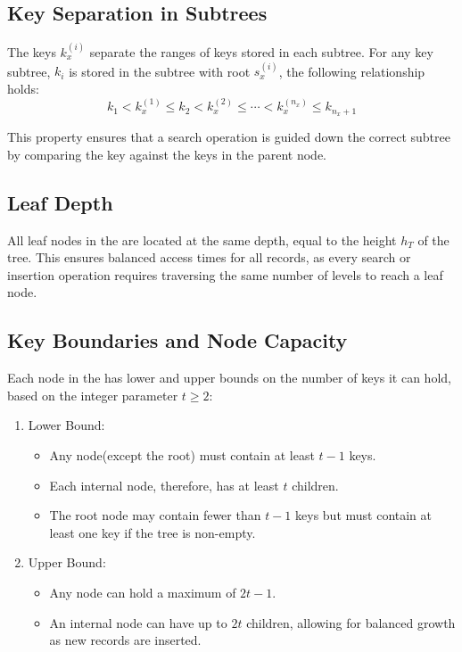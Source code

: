 \subsection{Key Separation in Subtrees}

The keys $k_x^{(i)}$ separate the ranges of keys stored in each subtree. For any key subtree, $k_i$ is stored in the subtree with root $s_x^{(i)}$, the following relationship holds:  $$k_1<k_x^{(1)}\le k_2<k_x^{(2)}\le \cdots <k_x^{(n_x)}\le k_{n_x+1}$$

This property ensures that a search operation is guided down the correct subtree by comparing the key against the keys in the parent node.

\subsection{Leaf Depth}
All leaf nodes in the \bplustree are located at the same depth, equal to the height $h_T$ of the tree. This ensures balanced access times for all records, as every search or insertion operation requires traversing the same number of levels to reach a leaf node.

\subsection{Key Boundaries and Node Capacity}
Each node in the \bplustree has lower and upper bounds on the number of keys it can hold, based on the integer parameter $t\ge 2$:
\begin{enumerate}
    \item Lower Bound:
    \begin{itemize}
        \item Any node(except the root) must contain at least $t-1$ keys.
        \item Each internal node, therefore, has at least $t$ children.
        \item The root node may contain fewer than $t-1$ keys but must contain at least one key if the tree is non-empty.
    \end{itemize}

    \item Upper Bound:
    \begin{itemize}
        \item Any node can hold a maximum of $2t-1$.
        \item An internal node can have up to $2t$ children, allowing for balanced growth as new records are inserted.
    \end{itemize}

\end{enumerate}

